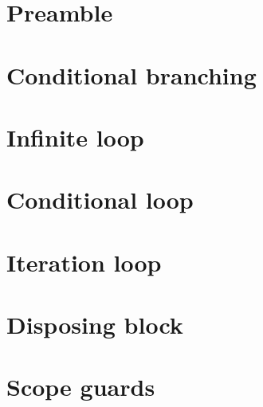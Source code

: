 \section{Preamble}

\section{Conditional branching}%
\label{sec:if_else}

\section{Infinite loop}%
\label{sec:inf_loop}

\section{Conditional loop}%
\label{sec:while_loop}

\section{Iteration loop}%
\label{sec:for_loop}

\section{Disposing block}%
\label{sec:with_block}

\section{Scope guards}%
\label{sec:scope_guards}
